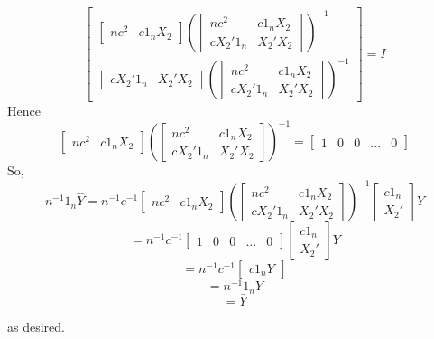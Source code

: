 \documentclass[10pt,letter]{article}
\begin{document}
\[\begin{bmatrix} \begin{bmatrix} n c^2 & c1_n X_2 \end{bmatrix}\left(\begin{bmatrix} nc^2 & c 1_n X_2 \\ c X_2'1_n & X_2'X_2 \end{bmatrix}\right)^{-1} \\ \begin{bmatrix} c X_2'1_n & X_2'X_2 \end{bmatrix}\left(\begin{bmatrix} nc^2 & c 1_n X_2 \\ c X_2'1_n & X_2'X_2 \end{bmatrix}\right)^{-1} \end{bmatrix} = I \]
Hence
\[\begin{bmatrix} n c^2 & c1_n X_2 \end{bmatrix}\left(\begin{bmatrix} nc^2 & c 1_n X_2 \\ c X_2'1_n & X_2'X_2 \end{bmatrix}\right)^{-1} = \begin{bmatrix} 1 & 0 & 0 & ... & 0 \end{bmatrix} \]
So,
\[ n^{-1} 1_n \hat{Y} = n^{-1}c^{-1} \begin{bmatrix} n c^2 & c1_n X_2 \end{bmatrix}\left(\begin{bmatrix} nc^2 & c 1_n X_2 \\ c X_2'1_n & X_2'X_2 \end{bmatrix}\right)^{-1}\begin{bmatrix} c 1_n \\ X_2' \end{bmatrix} Y \]
\[ = n^{-1}c^{-1} \begin{bmatrix} 1 & 0 & 0 & ... & 0 \end{bmatrix}\begin{bmatrix} c 1_n \\ X_2' \end{bmatrix} Y \]
\[ = n^{-1}c^{-1} \begin{bmatrix} c 1_n Y \end{bmatrix} \]
\[ = n^{-1} 1_n Y \]
\[ = \bar{Y} \]

as desired.
\end{document}
